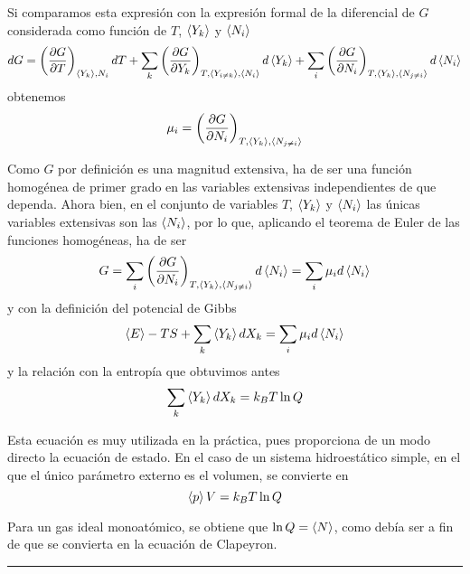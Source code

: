 Si comparamos esta expresión con la expresión formal de la diferencial de $G$ considerada como función de $T$, $\expval{Y_k}$ y $\expval{N_i}$
$$dG = \left( \pdv{G}{T} \right)_{\expval{Y_k}, N_i} dT + 
	\sum_k \left( \pdv{G}{Y_k} \right)_{T, \expval{Y_{i\neq k}}, \expval{N_i}} d\expval{Y_k} + 
	\sum_i \left( \pdv{G}{N_i} \right)_{T,\expval{Y_k}, \expval{N_{j\neq i}}} d\expval{N_i}$$
obtenemos
\begin{equation}
	\mu_i = \left( \pdv{G}{N_i} \right)_{T,\expval{Y_k}, \expval{N_{j\neq i}}}
\end{equation}

Como $G$ por definición es una magnitud extensiva, ha de ser una función homogénea de primer grado en las variables extensivas independientes de que dependa.
Ahora bien, en el conjunto de variables $T$, $\expval{Y_k}$ y $\expval{N_i}$ las únicas variables extensivas son las $\expval{N_i}$, por lo que, aplicando el teorema de Euler de las funciones homogéneas, ha de ser
\begin{equation}
	G = \sum_i \left( \pdv{G}{N_i}  \right)_{T,\expval{Y_k}, \expval{N_{j\neq i}}} d\expval{N_i} = \sum_i \mu_i d\expval{N_i}
\end{equation}
y con la definición del potencial de Gibbs
\begin{equation}
	\expval{E} - TS + \sum_k \expval{Y_k} dX_k = \sum_i \mu_i d\expval{N_i}
\end{equation}
y la relación con la entropía que obtuvimos antes
\begin{equation}
	\sum_k \expval{Y_k} dX_k = k_B T \ln Q
\end{equation}

Esta ecuación es muy utilizada en la práctica, pues proporciona de un modo directo la ecuación de estado. En el caso de un sistema hidroestático simple, en el que el único parámetro externo es el volumen, se convierte en
\begin{equation}
	\expval{p} V = k_B T \ln Q \label{eq:pvGb}
\end{equation}

Para un gas ideal monoatómico, se obtiene que $\ln Q = \expval{N}$, como debía ser a fin de que se convierta en la ecuación de Clapeyron.

\begin{center}
	\rule[0.5ex]{5em}{0.55pt}
\end{center}

